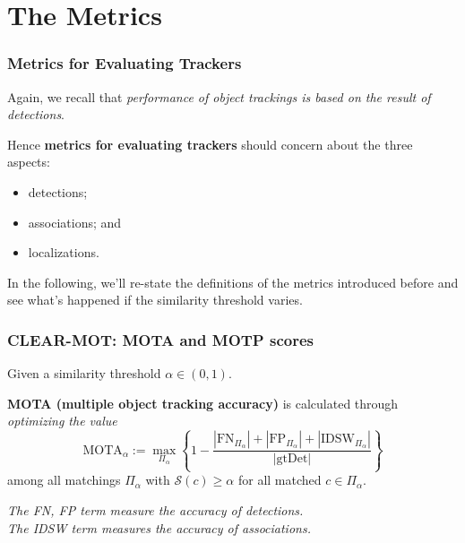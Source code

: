 \documentclass[slidetop, mathserif, dvipsnames]{beamer}
\begin{document}
\section{The Metrics}

\begin{frame}
	\frametitle{Metrics for Evaluating Trackers}
			
	Again, we recall that \emph{performance of object trackings is based 
	on the result of detections}.
			
	\vspace{5pt}

	Hence {\bf metrics for evaluating trackers} should concern about the three aspects:
	\begin{itemize}
		\item detections;%
		\item associations; and%
		\item localizations.%
	\end{itemize}

	\quad

	In the following, we'll re-state the definitions of the
	metrics introduced before and see what's happened if the similarity threshold
	varies.
	

\end{frame}


\begin{frame}
	\frametitle{CLEAR-MOT: MOTA and MOTP scores}
			
			
	Given a similarity threshold $\alpha\in (0,1)$.
			
	\vspace{4pt}
			
	{\bf MOTA (multiple object tracking accuracy)} is calculated through
	\emph{optimizing the value}
	\[
		\text{MOTA}_\alpha :=
		\max_{\Pi_\alpha}
		\left\{1 - \dfrac{|\text{FN}_{\Pi_\alpha}| + |\text{FP}_{\Pi_\alpha}| + |\text{IDSW}_{\Pi_\alpha}|}{|\text{gtDet}|}\right\}
	\]
	among all matchings $\Pi_\alpha$ with $\mathcal S(c)\geq \alpha$ for all matched $c\in\Pi_\alpha$.
			
	\vspace{4pt}
			
	\emph{\color{blue} The FN, FP term measure the accuracy of detections.} \\
	\emph{\color{olive} The IDSW term measures the accuracy of associations.}
			
	\vspace{4pt}
		
			
\end{frame}
\end{document}
